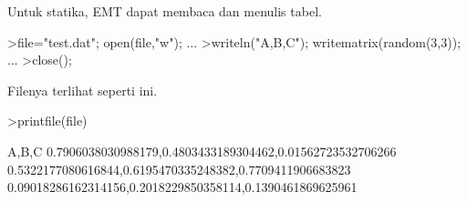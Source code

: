 \documentclass[a4paper,10pt]{article}
\begin{document}
\begin{eulernotebook}
\begin{eulercomment}
\begin{eulercomment}
\begin{eulercomment}
\begin{eulercomment}
\begin{eulercomment}
\begin{eulercomment}
\begin{eulercomment}
\begin{eulercomment}
\begin{eulercomment}
Untuk statika, EMT dapat membaca dan menulis tabel.
\end{eulercomment}
\begin{eulerprompt}
>file="test.dat"; open(file,"w"); ...
>writeln("A,B,C"); writematrix(random(3,3)); ...
>close();
\end{eulerprompt}
\begin{eulercomment}
Filenya terlihat seperti ini.
\end{eulercomment}
\begin{eulerprompt}
>printfile(file)
\end{eulerprompt}
\begin{euleroutput}
  A,B,C
  0.7906038030988179,0.4803433189304462,0.01562723532706266
  0.5322177080616844,0.6195470335248382,0.7709411906683823
  0.09018286162314156,0.2018229850358114,0.1390461869625961
  

\end{euleroutput}
\end{eulercomment}
\end{eulercomment}
\end{eulercomment}
\end{eulercomment}
\end{eulercomment}
\end{eulercomment}
\end{eulercomment}
\end{eulercomment}
\end{eulernotebook}
\end{document}
